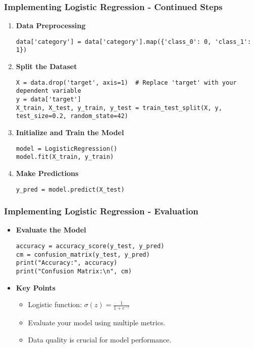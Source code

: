 \documentclass[aspectratio=169]{beamer}
\begin{document}
\begin{frame}[fragile]
    \frametitle{Implementing Logistic Regression - Continued Steps}
    \begin{enumerate}[resume]
        \item \textbf{Data Preprocessing}
            \begin{lstlisting}
data['category'] = data['category'].map({'class_0': 0, 'class_1': 1})
            \end{lstlisting}
        \item \textbf{Split the Dataset}
            \begin{lstlisting}
X = data.drop('target', axis=1)  # Replace 'target' with your dependent variable
y = data['target']
X_train, X_test, y_train, y_test = train_test_split(X, y, test_size=0.2, random_state=42)
            \end{lstlisting}
        \item \textbf{Initialize and Train the Model}
            \begin{lstlisting}
model = LogisticRegression()
model.fit(X_train, y_train)
            \end{lstlisting}
        \item \textbf{Make Predictions}
            \begin{lstlisting}
y_pred = model.predict(X_test)
            \end{lstlisting}
    \end{enumerate}
\end{frame}

\begin{frame}[fragile]
    \frametitle{Implementing Logistic Regression - Evaluation}
    \begin{itemize}
        \item \textbf{Evaluate the Model}
            \begin{lstlisting}
accuracy = accuracy_score(y_test, y_pred)
cm = confusion_matrix(y_test, y_pred)
print("Accuracy:", accuracy)
print("Confusion Matrix:\n", cm)
            \end{lstlisting}
        \item \textbf{Key Points}
            \begin{itemize}
                \item Logistic function: \( \sigma(z) = \frac{1}{1 + e^{-z}} \)
                \item Evaluate your model using multiple metrics.
                \item Data quality is crucial for model performance.
            \end{itemize}
    \end{itemize}
\end{frame}
\end{document}
